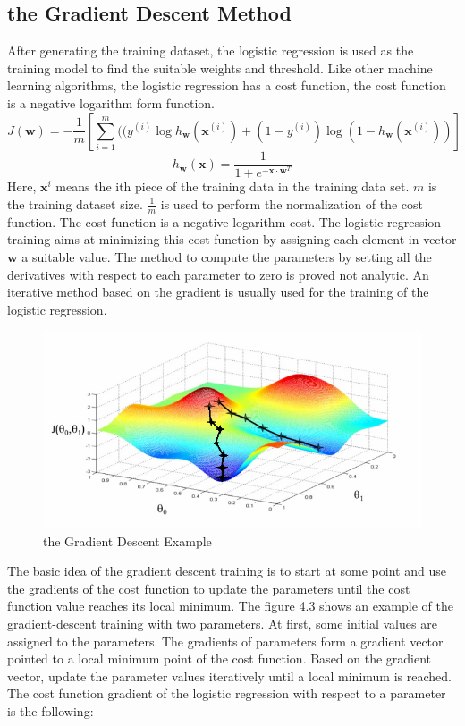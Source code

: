 \subsection{the Gradient Descent Method}
After generating the training dataset, the logistic regression is used as the training model to find the suitable weights and threshold. Like other machine learning algorithms, the logistic regression has a cost function, the cost function is  a negative logarithm form function.
\begin{equation}
J(\textbf{w})= - \frac{1}{m}[\sum_{i=1}^m ((y^{(i)}\log h_\textbf{w}(\textbf{x}^{(i)}) +(1-y^{(i)})\log (1-h_\textbf{w}(\textbf{x}^{(i)}))]
\end{equation}
\begin{equation}
h_\textbf{w}(\textbf{x})= \frac{1}{1+e^{- \textbf{x} \cdot \textbf{w}^T}}
\end{equation}
Here, $\textbf{x}^{i}$ means the ith piece of the training data in the training data set. $m$ is the training dataset size. $\frac{1}{m}$ is used to perform the normalization of the cost function. The cost function is a negative logarithm cost. The logistic regression training aims at minimizing this cost function by assigning each element in vector $\textbf{w}$ a suitable value. The method to compute the parameters by setting all the derivatives with respect to each parameter to zero is proved not analytic. An iterative method based on the gradient is usually used for the training of the logistic regression.
\begin{center}
\begin{figure}
\centering
\includegraphics[scale=0.8]{gradient-descent.png}
\caption{the Gradient Descent Example \cite{gradient-descent} }
\end{figure}
\end{center}
The basic idea of the gradient descent training is to start at some point and use the gradients of the cost function to update the parameters until the cost function value reaches its local minimum. The figure 4.3 shows an example of the gradient-descent training with two parameters. At first, some initial values are assigned to the parameters. The gradients of parameters form a gradient vector pointed to a local minimum point of the cost function. Based on the gradient vector, update the parameter values iteratively until a local minimum is reached. The cost function gradient of the logistic regression with respect to a parameter is the following:
